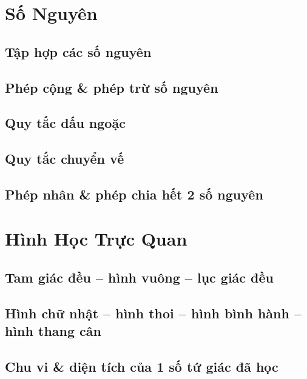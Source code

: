 \documentclass{article}
\numberwithin{equation}{section}
\begin{document}

\section{Số Nguyên}

\subsection{Tập hợp các số nguyên}

\subsection{Phép cộng \& phép trừ số nguyên}

\subsection{Quy tắc dấu ngoặc}

\subsection{Quy tắc chuyển vế}

\subsection{Phép nhân \& phép chia hết 2 số nguyên}


\newpage
\section{Hình Học Trực Quan}

\subsection{Tam giác đều -- hình vuông -- lục giác đều}

\subsection{Hình chữ nhật -- hình thoi -- hình bình hành -- hình thang cân}

\subsection{Chu vi \& diện tích của 1 số tứ giác đã học}
\end{document}

